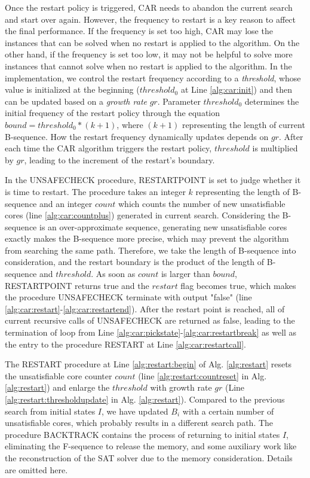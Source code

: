 Once the restart policy is triggered, CAR needs to abandon the current search and start over again. However, the frequency to restart is a key reason to affect the final performance. If the frequency is set too high, CAR may lose the instances that can be solved when no restart is applied to the algorithm. On the other hand, if the frequency is set too low, it may not be helpful to solve more instances that cannot solve when no restart is applied to the algorithm. In the implementation, we control the restart frequency according to a \emph{threshold}, whose value is initialized at the beginning ($threshold_0$ at Line \ref{alg:car:init}) and then can be updated based on a \emph{growth rate} $gr$. Parameter $threshold_0$ determines the initial frequency of the restart policy through the equation $bound = threshold_0 * (k+1)$, where $(k+1)$ representing the length of current B-sequence. How the restart frequency dynamically updates depends on $gr$. After each time the CAR algorithm triggers the restart policy, $threshold$ is multiplied by $gr$, leading to the increment of the restart's boundary. 

In the UNSAFECHECK procedure,  RESTARTPOINT is set to judge whether it is time to restart. The procedure takes an integer $k$ representing the length of B-sequence and an integer $count$ which counts the number of new unsatisfiable cores (line \ref{alg:car:countplus}) generated in current search.  Considering the B-sequence is an over-approximate sequence, generating new unsatisfiable cores exactly makes the B-sequence more precise, which may prevent the algorithm from searching the same path. Therefore, we take the length of B-sequence into consideration, and the restart boundary is the product of the length of B-sequence and $threshold$. As soon as  $count$ is larger than $bound$, RESTARTPOINT returns true and the $restart$ flag becomes true, which makes the procedure UNSAFECHECK terminate with output "false" (line \ref{alg:car:restart}-\ref{alg:car:restartend}). After the restart point is reached, all of current recursive calls of UNSAFECHECK are returned as false, leading to the termination of loop from Line \ref{alg:car:pickstate}-\ref{alg:car:restartbreak} as well as the entry to the procedure RESTART at Line \ref{alg:car:restartcall}.

The RESTART procedure at Line \ref{alg:restart:begin} of Alg. \ref{alg:restart} resets the unsatisfiable core counter $count$ (line \ref{alg:restart:countreset} in Alg. \ref{alg:restart}) and enlarge the $threshold$ with growth rate $gr$ (Line \ref{alg:restart:thresholdupdate} in Alg. \ref{alg:restart}). Compared to the previous search from initial states $I$, we have updated $B_{i}$ with a certain number of unsatisfiable cores, which probably results in a different search path.
The procedure BACKTRACK contains the process of returning to initial states $I$, eliminating the F-sequence to release the memory, and some auxiliary work like the reconstruction of the SAT solver due to the memory consideration. Details are omitted here.

